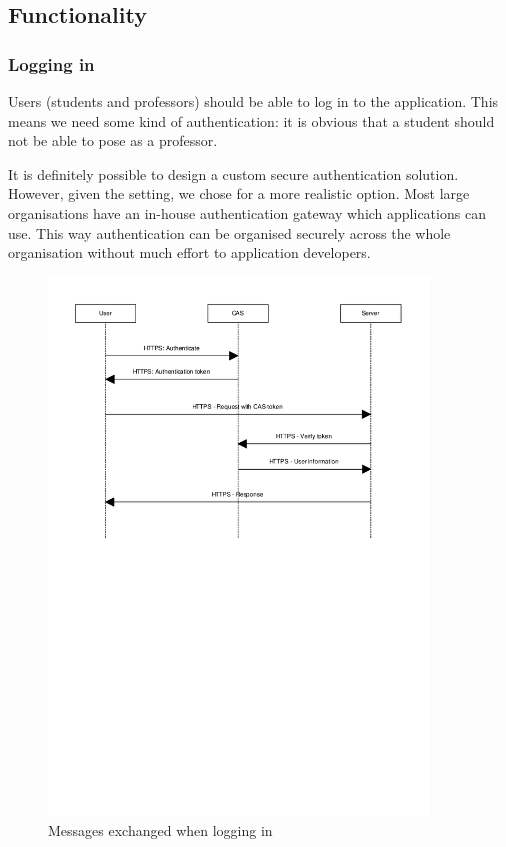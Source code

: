 \documentclass{article}
\begin{document}
\subsection{Functionality}

\subsubsection{Logging in}

Users (students and professors) should be able to log in to the application.
This means we need some kind of authentication: it is obvious that a student
should not be able to pose as a professor.

It is definitely possible to design a custom secure authentication solution.
However, given the setting, we chose for a more realistic option. Most large
organisations have an in-house authentication gateway which applications can
use. This way authentication can be organised securely across the whole
organisation without much effort to application developers.

\begin{figure}
\begin{center}
\includegraphics[width=0.9\textwidth]{images/login.pdf}
\caption{Messages exchanged when logging in}
\label{fig:login}
\end{center}
\end{figure}
\end{document}
